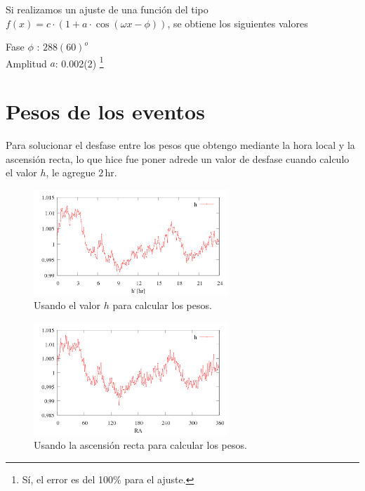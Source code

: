 Si realizamos un ajuste de una función del tipo $f(x) = c\cdot(1 + a\cdot\cos{(\omega x - \phi)})$, se obtiene los siguientes valores
		
	Fase $\phi$ : $288(60)^o$  \\
	Amplitud $a$: 0.002(2) \footnote{Sí, el error es del 100\% para el ajuste.}  	 \\
		

\section{Pesos de los eventos}

		
		Para solucionar el desfase entre los pesos que obtengo mediante la hora local y la ascensión recta, lo que hice fue poner adrede un valor de desfase cuando calculo el valor $h$, le agregue $2\,$hr. 
		
		\begin{figure}[H]
			\centering
			\includegraphics[width=0.65\textwidth]{eventos_hora_local.png}
			\caption{Usando el valor $h$ para calcular los pesos.}
		\end{figure}
		
		
		\begin{figure}[H]
			\centering
			\includegraphics[width=0.65\textwidth]{eventos_RA.png}
			\caption{Usando la ascensión recta para calcular los pesos.}
		\end{figure}
		

